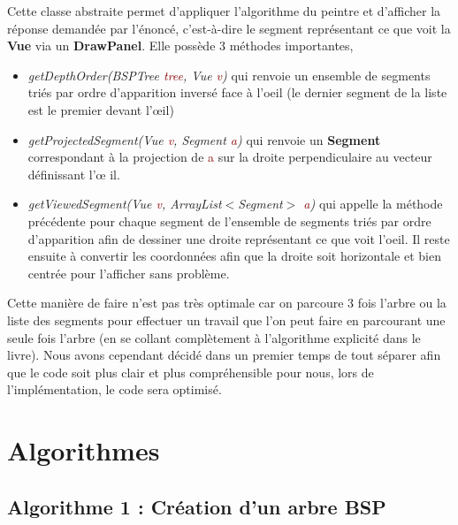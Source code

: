 \documentclass{article}
\newcommand{\red}[1]{\textcolor{darkred}{#1}}
\begin{document}
Cette classe abstraite permet d'appliquer l'algorithme du peintre et d'afficher la réponse demandée 
par l'énoncé, c'est-à-dire le segment représentant ce que voit la \textbf{Vue} via un 
\textbf{DrawPanel}. Elle possède 3 méthodes importantes, 
\begin{itemize}
\item \textit{getDepthOrder(BSPTree \red{tree}, Vue \red{v})} qui renvoie un ensemble de segments 
triés par ordre d'apparition inversé face à l'oeil (le dernier segment de la liste est le premier 
devant l'\oe il)
\item \textit{getProjectedSegment(Vue \red{v}, Segment \red{a})} qui renvoie un \textbf{Segment} 
correspondant à la projection de \red{a} sur la droite perpendiculaire au vecteur définissant l'\oe 
il.
\item \textit{getViewedSegment(Vue \red{v}, ArrayList$<$Segment$>$ \red{a})} qui appelle la méthode 
précédente pour chaque segment de l'ensemble de segments triés par ordre d'apparition afin de 
dessiner une droite représentant ce que voit l'oeil. Il reste ensuite à convertir les coordonnées 
afin que la droite soit horizontale et bien centrée pour l'afficher sans problème.
\end{itemize}
Cette manière de faire n'est pas très optimale car on parcoure 3 fois l'arbre ou la liste des 
segments pour effectuer un travail que l'on peut faire en parcourant une seule fois l'arbre (en se 
collant complètement à l'algorithme explicité dans le livre). Nous avons cependant décidé dans un 
premier temps de tout séparer afin que le code soit plus clair et plus compréhensible pour nous, 
lors de l'implémentation, le code sera optimisé.


\section{Algorithmes}

\subsection{Algorithme 1 : Création d'un arbre BSP}
\end{document}
